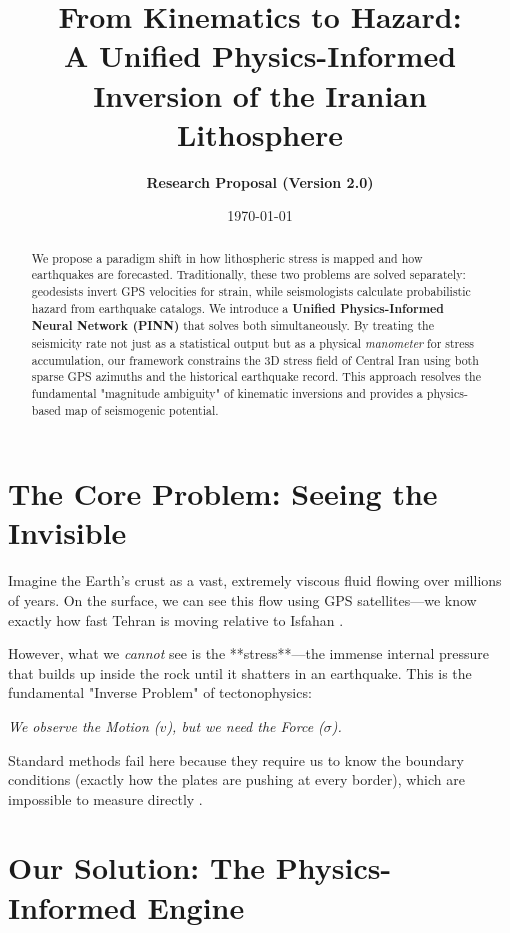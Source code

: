 \documentclass[11pt, a4paper]{article}
\title{\textbf{From Kinematics to Hazard: \\ A Unified Physics-Informed Inversion of the Iranian Lithosphere}}
\author{\textbf{Research Proposal (Version 2.0)}}
\date{\today}
\begin{document}
\maketitle

\begin{abstract}
We propose a paradigm shift in how lithospheric stress is mapped and how earthquakes are forecasted. Traditionally, these two problems are solved separately: geodesists invert GPS velocities for strain, while seismologists calculate probabilistic hazard from earthquake catalogs. We introduce a \textbf{Unified Physics-Informed Neural Network (PINN)} that solves both simultaneously. By treating the seismicity rate not just as a statistical output but as a physical \textit{manometer} for stress accumulation, our framework constrains the 3D stress field of Central Iran using both sparse GPS azimuths and the historical earthquake record. This approach resolves the fundamental "magnitude ambiguity" of kinematic inversions and provides a physics-based map of seismogenic potential.
\end{abstract}

\section{The Core Problem: Seeing the Invisible}

Imagine the Earth's crust as a vast, extremely viscous fluid flowing over millions of years. On the surface, we can see this flow using GPS satellites---we know exactly how fast Tehran is moving relative to Isfahan \cite{Khorrami2019}.

However, what we \textit{cannot} see is the **stress**---the immense internal pressure that builds up inside the rock until it shatters in an earthquake. This is the fundamental "Inverse Problem" of tectonophysics:
\begin{center}
    \textit{We observe the Motion ($v$), but we need the Force ($\sigma$).}
\end{center}

Standard methods fail here because they require us to know the boundary conditions (exactly how the plates are pushing at every border), which are impossible to measure directly \cite{Zamani2017}.

\section{Our Solution: The Physics-Informed Engine}
\end{document}
